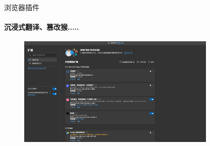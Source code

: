 \documentclass{beamer}
\begin{document}
\begin{frame}{浏览器插件}
\framesubtitle{沉浸式翻译、篡改猴.....}
    \begin{figure}
        \centering
        \includegraphics[width=0.85\textwidth]{assets/image.png}
    \end{figure}

\end{frame}
\end{document}
